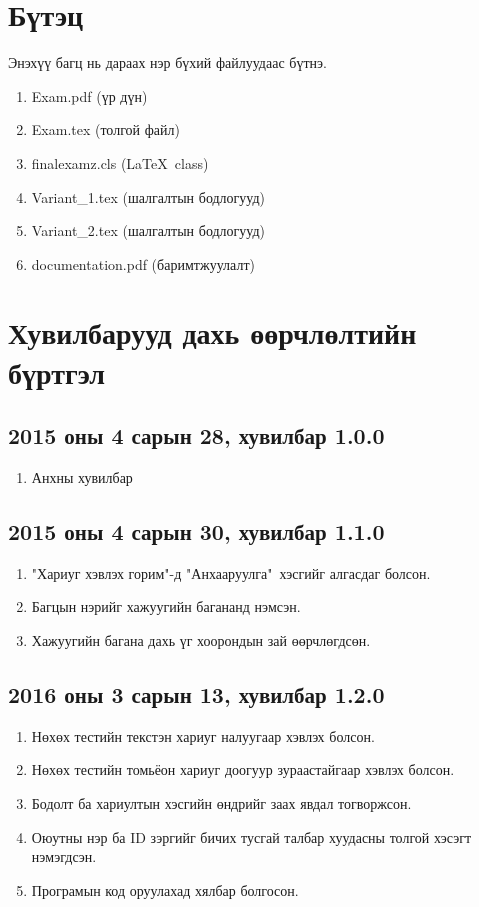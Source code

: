 \documentclass[10pt]{article}
\theoremstyle{definition}
\begin{document}
\section{Бүтэц}

Энэхүү багц нь дараах нэр бүхий файлуудаас бүтнэ.
\begin{enumerate}
 \item Exam.pdf (үр дүн)
 \item Exam.tex (толгой файл)
 \item finalexamz.cls (\LaTeX\ class)
 \item Variant\_1.tex (шалгалтын бодлогууд)
 \item Variant\_2.tex (шалгалтын бодлогууд)
 \item documentation.pdf (баримтжуулалт)
\end{enumerate}

\section{Хувилбарууд дахь өөрчлөлтийн бүртгэл}

\subsection{2015 оны 4 сарын 28, хувилбар 1.0.0}

\begin{enumerate}
 \item Анхны хувилбар
\end{enumerate}

\subsection{2015 оны 4 сарын 30, хувилбар 1.1.0}

\begin{enumerate}
 \item "Хариуг хэвлэх горим"{}-д "Анхааруулга"\ хэсгийг алгасдаг болсон.
 \item Багцын нэрийг хажуугийн багананд нэмсэн.
 \item Хажуугийн багана дахь үг хоорондын зай өөрчлөгдсөн.
\end{enumerate}

\subsection{2016 оны 3 сарын 13, хувилбар 1.2.0}

\begin{enumerate}
 \item Нөхөх тестийн текстэн хариуг налуугаар хэвлэх болсон.
 \item Нөхөх тестийн томьёон хариуг доогуур зураастайгаар хэвлэх болсон.
 \item Бодолт ба хариултын хэсгийн өндрийг заах явдал тогворжсон.
 \item Оюутны нэр ба ID зэргийг бичих тусгай талбар хуудасны толгой хэсэгт нэмэгдсэн.
 \item Програмын код оруулахад хялбар болгосон.
\end{enumerate}
\end{document}
